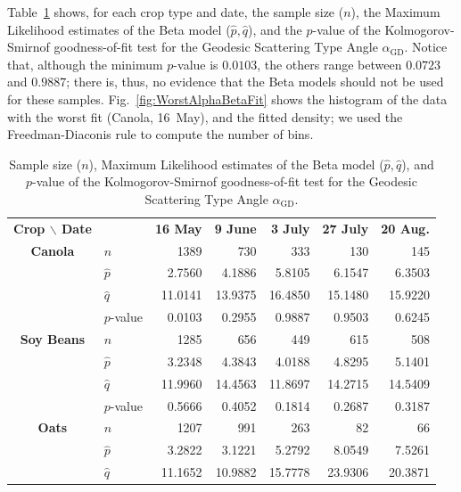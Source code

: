 \documentclass[journal]{IEEEtran}
\begin{document}
	Table~\ref{tab:params_alpha} shows, for each crop type and date, 
	the sample size ($n$), 
	the Maximum Likelihood estimates of the Beta model ($\widehat p,\widehat q$), and the $p$-value of the Kolmogorov-Smirnof goodness-of-fit test for the Geodesic Scattering Type Angle $\alpha_{\text{GD}}$.
	Notice that, although the minimum $p$-value is $0.0103$, the others range between $0.0723$ and $0.9887$; there is, thus, no evidence that the Beta models should not be used for these samples.
	Fig.~\ref{fig:WorstAlphaBetaFit} shows the histogram of the data with the worst fit (Canola, 16~May), and the fitted density; we used the Freedman-Diaconis rule to compute the number of bins.
	
	\begin{table}[hbt]
		\centering
		\caption{Sample size ($n$), Maximum Likelihood estimates of the Beta model ($\widehat p,\widehat q$), and $p$-value of the Kolmogorov-Smirnof goodness-of-fit test for the Geodesic Scattering Type Angle $\alpha_{\text{GD}}$.}
		\label{tab:params_alpha}
		\setlength{\tabcolsep}{3.8pt}
		\begin{tabular}{clrrrrr}
			\toprule
			\textbf{Crop $\backslash$ Date} & & \textbf{16 May} & \textbf{9 June} & \textbf{3 July} & \textbf{27 July} & \textbf{20 Aug.}\\ \cmidrule(lr){1-2} \cmidrule(lr){3-3} \cmidrule(lr){4-4} \cmidrule(lr){5-5} \cmidrule(lr){6-6} \cmidrule(lr){7-7}
			\textbf{Canola} 	& $n$ 			& 1389 		& 730 		& 333 		& 130 		& 145\\
			& $\widehat{p}$ & 2.7560 	& 4.1886 	& 5.8105 	& 6.1547 	& 6.3503\\
			& $\widehat{q}$ & 11.0141 	& 13.9375 	& 16.4850 	& 15.1480 	& 15.9220\\ 
			& $p$-value 	& 0.0103 	& 0.2955 	& 0.9887 	& 0.9503 	& 0.6245\\		
			\midrule
			\textbf{Soy Beans}	& $n$ 			& 1285 		& 656 		& 449 		& 615 		& 508\\
			& $\widehat{p}$ & 3.2348 	& 4.3843 	& 4.0188 	& 4.8295 	& 5.1401\\
			& $\widehat{q}$ & 11.9960 	& 14.4563 	& 11.8697 	& 14.2715 	& 14.5409\\ 
			& $p$-value 	& 0.5666 	& 0.4052 	& 0.1814 	& 0.2687 	& 0.3187\\			
			\midrule
			\textbf{Oats}	& $n$ 			& 1207 		& 991 		& 263 		& 82 		& 66\\
			& $\widehat{p}$ & 3.2822  	& 3.1221 	& 5.2792 	& 8.0549 	& 7.5261\\
			& $\widehat{q}$ & 11.1652 	& 10.9882 	& 15.7778 	& 23.9306 	& 20.3871\\ 

\end{tabular}
\end{table}
\end{document}
